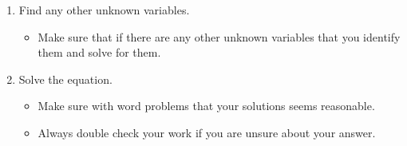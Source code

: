 \documentclass[12pt]{article}
\begin{document}
\begin{enumerate}
      \item Find any other unknown variables.
      \begin{itemize}
        \item Make sure that if there are any other unknown variables that you identify them and solve for them.
      \end{itemize}
  \newpage
      \item Solve the equation.
      \begin{itemize}
        \item Make sure with word problems that your solutions seems reasonable.
        \item Always double check your work if you are unsure about your answer.
      \end{itemize}
    \end{enumerate}
\end{document}
